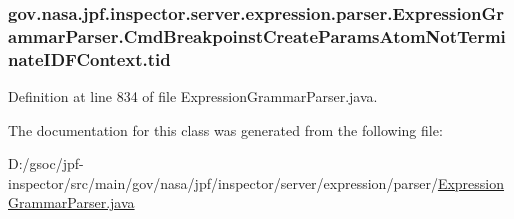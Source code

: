 \subsubsection[{\texorpdfstring{tid}{tid}}]{ gov.\+nasa.\+jpf.\+inspector.\+server.\+expression.\+parser.\+Expression\+Grammar\+Parser.\+Cmd\+Breakpoinst\+Create\+Params\+Atom\+Not\+Terminate\+I\+D\+F\+Context.\+tid}\hypertarget{classgov_1_1nasa_1_1jpf_1_1inspector_1_1server_1_1expression_1_1parser_1_1_expression_grammar_paee196826319d0ea00470866a7ffd8d7b_a706a2ab53e582aef119a058b80cedd75}{}\label{classgov_1_1nasa_1_1jpf_1_1inspector_1_1server_1_1expression_1_1parser_1_1_expression_grammar_paee196826319d0ea00470866a7ffd8d7b_a706a2ab53e582aef119a058b80cedd75}


Definition at line 834 of file Expression\+Grammar\+Parser.\+java.



The documentation for this class was generated from the following file\+:\begin{DoxyCompactItemize}
\item 
D\+:/gsoc/jpf-\/inspector/src/main/gov/nasa/jpf/inspector/server/expression/parser/\hyperlink{_expression_grammar_parser_8java}{Expression\+Grammar\+Parser.\+java}\end{DoxyCompactItemize}
